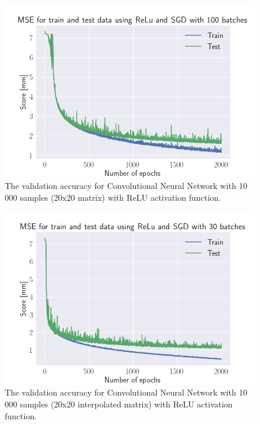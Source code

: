 \documentclass[a4paper, UKenglish, 11pt]{uiomaster}
\begin{document}
\begin{figure}[!htb]
    \centering
    \includegraphics[width=\linewidth]{../Code/plots/CNN/MSE_2d_CNN_20x20_10000_ReLu_and_SGD_100_2000.png}
    \caption{The validation accuracy for Convolutional Neural Network with 10 000 samples (20x20 matrix) with ReLU activation function. }
    \label{fig:single_dipole_accuracy_CNN_2d}
\end{figure}

\begin{figure}[!htb]
    \centering
    \includegraphics[width=\linewidth]{../Code/plots/CNN/MSE_interpolated_CNN_20x20_10000_ReLu_and_SGD_30_2000.png}
    \caption{The validation accuracy for Convolutional Neural Network with 10 000 samples (20x20 interpolated matrix) with ReLU activation function. }
    \label{fig:single_dipole_accuracy_CNN}
\end{figure}
\end{document}
